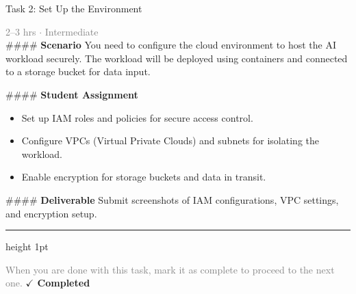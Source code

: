 \documentclass[10pt,a4paper]{article}
\begin{document}
\begin{taskbox}{Task 2: Set Up the Environment}

    {\small \textcolor{gray}{2--3 hrs $\cdot$ Intermediate}}\\[12pt]

    \#\#\#\# \textbf{Scenario}
You need to configure the cloud environment to host the AI workload securely. The workload will be deployed using containers and connected to a storage bucket for data input.

\#\#\#\# \textbf{Student Assignment}
\begin{itemize}
    \item Set up IAM roles and policies for secure access control.
    \item Configure VPCs (Virtual Private Clouds) and subnets for isolating the workload.
    \item Enable encryption for storage buckets and data in transit.
\end{itemize}

\#\#\#\# \textbf{Deliverable}
Submit screenshots of IAM configurations, VPC settings, and encryption setup.\par

    \vspace{16pt}

    \textcolor{cardBorder}{\hrule height 1pt}\vspace{8pt}

    \small \textcolor{gray}{When you are done with this task, mark it as complete to proceed to the next one.} \hfill \textbf{\textcolor{brandDark}{$\checkmark$ Completed}}

\end{taskbox}
\end{document}
